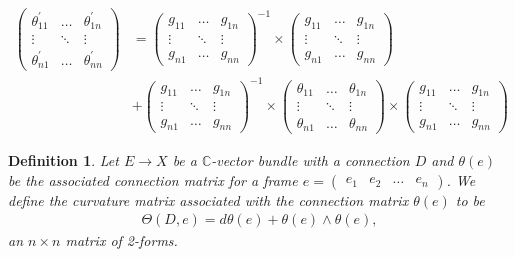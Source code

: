 \documentclass[a4paper,10pt]{amsart}
\newtheorem{definition}{Definition}[section]
\newcommand{\C}{\mathbb C} %
\begin{document}
\begin{align*}
    \begin{pmatrix}
        \theta_{11}^{'} & \ldots & \theta_{1n}^{'}\\
       \vdots      & \ddots & \vdots \\
        \theta_{n1}^{'} & \ldots & \theta_{nn}^{'}
    \end{pmatrix} &= 
    \begin{pmatrix}
       g_{11} & \ldots & g_{1n}\\
       \vdots      & \ddots & \vdots \\
       g_{n1} & \ldots & g_{nn}
    \end{pmatrix}^{-1} \times 
    \begin{pmatrix}
       g_{11} & \ldots & g_{1n}\\
       \vdots      & \ddots & \vdots \\
       g_{n1} & \ldots & g_{nn}
   \end{pmatrix} \\
    &+ 
    \begin{pmatrix}
       g_{11} & \ldots & g_{1n}\\
       \vdots      & \ddots & \vdots \\
       g_{n1} & \ldots & g_{nn}
    \end{pmatrix}^{-1} \times 
    \begin{pmatrix}
       \theta_{11} & \ldots & \theta_{1n}\\
       \vdots      & \ddots & \vdots \\
       \theta_{n1} & \ldots & \theta_{nn}
   \end{pmatrix} \times
    \begin{pmatrix}
       g_{11} & \ldots & g_{1n}\\
       \vdots      & \ddots & \vdots \\
       g_{n1} & \ldots & g_{nn}
   \end{pmatrix} 
\end{align*}

\begin{definition}
   Let $E \rightarrow X$ be a $\C$-vector bundle with a connection 
   $D$ and $\theta(e)$ be the associated connection matrix for a
   frame $e = \begin{pmatrix}
        e_{1} & e_{2} & \ldots & e_{n} 
    \end{pmatrix}$. We define the curvature matrix associated with
    the connection matrix $\theta(e)$ to be 
   \begin{align*}
       \Theta(D,e) = d\theta(e) + \theta(e) \wedge \theta(e),
   \end{align*}
   an $n \times n$ matrix of 2-forms.
\end{definition}
\end{document}

